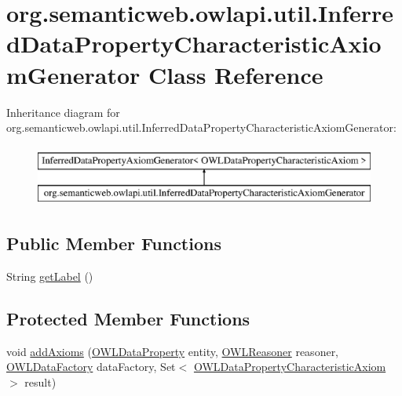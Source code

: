 \hypertarget{classorg_1_1semanticweb_1_1owlapi_1_1util_1_1_inferred_data_property_characteristic_axiom_generator}{\section{org.\-semanticweb.\-owlapi.\-util.\-Inferred\-Data\-Property\-Characteristic\-Axiom\-Generator Class Reference}
\label{classorg_1_1semanticweb_1_1owlapi_1_1util_1_1_inferred_data_property_characteristic_axiom_generator}
}
Inheritance diagram for org.\-semanticweb.\-owlapi.\-util.\-Inferred\-Data\-Property\-Characteristic\-Axiom\-Generator\-:\begin{figure}[H]
\begin{center}
\leavevmode
\includegraphics[height=2.000000cm]{classorg_1_1semanticweb_1_1owlapi_1_1util_1_1_inferred_data_property_characteristic_axiom_generator}
\end{center}
\end{figure}
\subsection*{Public Member Functions}
\begin{DoxyCompactItemize}
\item 
String \hyperlink{classorg_1_1semanticweb_1_1owlapi_1_1util_1_1_inferred_data_property_characteristic_axiom_generator_acd159a1ac204dc78a8fb215c095f1d1f}{get\-Label} ()
\end{DoxyCompactItemize}
\subsection*{Protected Member Functions}
\begin{DoxyCompactItemize}
\item 
void \hyperlink{classorg_1_1semanticweb_1_1owlapi_1_1util_1_1_inferred_data_property_characteristic_axiom_generator_a1ca6aeb8f1832483097d54adddc81812}{add\-Axioms} (\hyperlink{interfaceorg_1_1semanticweb_1_1owlapi_1_1model_1_1_o_w_l_data_property}{O\-W\-L\-Data\-Property} entity, \hyperlink{interfaceorg_1_1semanticweb_1_1owlapi_1_1reasoner_1_1_o_w_l_reasoner}{O\-W\-L\-Reasoner} reasoner, \hyperlink{interfaceorg_1_1semanticweb_1_1owlapi_1_1model_1_1_o_w_l_data_factory}{O\-W\-L\-Data\-Factory} data\-Factory, Set$<$ \hyperlink{interfaceorg_1_1semanticweb_1_1owlapi_1_1model_1_1_o_w_l_data_property_characteristic_axiom}{O\-W\-L\-Data\-Property\-Characteristic\-Axiom} $>$ result)
\end{DoxyCompactItemize}


